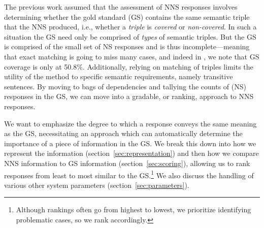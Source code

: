 \documentclass[11pt,letterpaper]{article}
\newcommand{\md}[1]{\marginpar{\scriptsize MD: #1}}
\newcommand{\lk}[1]{\marginpar{\scriptsize LK: #1}}
\renewcommand{\marginpar}[1]{}
\begin{document}
The previous work assumed that the assessment of NNS responses
involves determining whether the gold standard (GS) contains the same
semantic triple that the NNS produced, i.e., whether a \textit{triple}
is \textit{covered} or \textit{non-covered}.  In such a situation the
GS need only be comprised of \textit{types} of semantic triples.  But
the GS is comprised of the small set of NS responses\md{I just noticed that I don't
  think we ever said that GS=NS responses}\lk{nice catch---that explains the reviewer's confusion} and is thus
incomplete---meaning that exact matching is going to miss many cases,
and indeed in \citet{king:dickinson:13}, we note
that GS coverage is only at 50.8\%.  Additionally, relying on matching
of triples limits the utility of the method to specific semantic
requirements, namely transitive sentences.  By moving to bags of
dependencies and tallying the counts of (NS) responses in the GS, we
can move into a gradable, or ranking, approach to NNS responses.

We want to emphasize the degree to which a response conveys the same
meaning as the GS, necessitating an approach which can automatically
determine the importance of a piece of information in the GS.  We
break this down into how we represent the information
(section~\ref{sec:representation}) and then how we compare NNS
information to GS information (section~\ref{sec:scoring}), allowing us
to rank responses from least to most similar to the GS.\footnote{Although rankings often go from highest to lowest, we prioritize identifying problematic cases, so we rank accordingly.}  We also
discuss the handling of various other system parameters (section~\ref{sec:parameters}).
\end{document}
